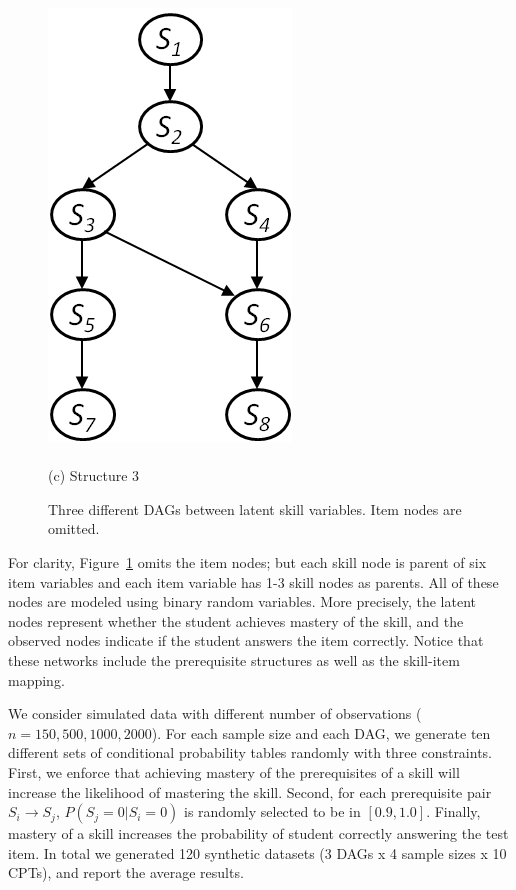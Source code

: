 \documentclass{edm_template}
\begin{document}
\begin{figure}[!ht]
\begin{minipage}[b]{0.45\linewidth}
			\includegraphics[width=0.7\linewidth]{figures/model3.png}\\~\\
			(c) Structure 3
		\end{minipage}	
		\caption{Three different DAGs between latent skill variables.  Item nodes are omitted.}
		\label{fig:syn-nets}
	\end{figure} 
	
	For clarity, Figure~\ref{fig:syn-nets}  omits the item nodes;
	but each skill node is parent of six item variables and each item variable has 1-3 skill nodes as parents.
	All of these nodes are modeled using binary random variables.
	More precisely, the latent  nodes represent whether the student  achieves mastery of the skill,
	and the observed nodes indicate if the student answers the item correctly.
	Notice that these networks include the prerequisite structures as well as the skill-item mapping.
	
	We consider simulated data with different number of observations ($n=150, 500, 1000, 2000$).
	For each sample size and each  DAG, we generate ten different sets of conditional probability tables
	randomly with three constraints.
	First, we enforce that achieving mastery of the prerequisites of a skill will increase the likelihood of mastering the skill.
	Second, for each prerequisite pair $S_i\rightarrow S_j$,  $P(S_j=0|S_i=0)$ is randomly selected to be in $[0.9, 1.0]$.
	Finally, mastery of a skill increases the probability of student correctly answering the test item. 
	In total we generated 120 synthetic datasets (3 DAGs x 4 sample sizes x 10 CPTs), and  report the average results.
	
\end{document}
